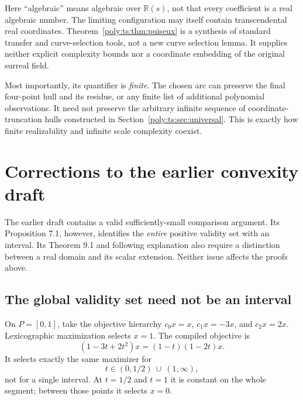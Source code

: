 \documentclass[11pt,a4paper]{article}
\numberwithin{equation}{section}
\theoremstyle{plain}
\newcommand{\R}{\mathbb R}
\begin{document}
Here ``algebraic'' means algebraic over $\R(s)$, not that every coefficient
is a real algebraic number. The limiting configuration may itself contain
transcendental real coordinates. Theorem~\ref{poly:ts:thm:puiseux} is a synthesis
of standard transfer and curve-selection tools, not a new curve selection
lemma. It supplies neither explicit complexity bounds nor a coordinate
embedding of the original surreal field.

Most importantly, its quantifier is \emph{finite}. The chosen arc can
preserve the final four-point hull and its residue, or any finite list of
additional polynomial observations. It need not preserve the arbitrary
infinite sequence of coordinate-truncation hulls constructed in
Section~\ref{poly:ts:sec:universal}. This is exactly how finite realizability and
infinite scale complexity coexist.

\section{Corrections to the earlier convexity draft}
\label{poly:sec:corrections}

The earlier draft \cite{fs:PriorDraft} contains a valid sufficiently-small
comparison argument. Its Proposition 7.1, however, identifies the
\emph{entire} positive validity set with an interval. Its Theorem 9.1 and
following explanation also require a distinction between a real domain
and its scalar extension. Neither issue affects the proofs above.

\subsection{The global validity set need not be an interval}

On $P=[0,1]$, take the objective hierarchy
$c_0x=x$, $c_1x=-3x$, and $c_2x=2x$. Lexicographic maximization selects
$x=1$. The compiled objective is
\[
 (1-3t+2t^2)x=(1-t)(1-2t)x.
\]
It selects exactly the same maximizer for
\begin{equation}\label{poly:eq:reentry}
 t\in(0,1/2)\ \cup\ (1,\infty),
\end{equation}
not for a single interval. At $t=1/2$ and $t=1$ it is constant on the
whole segment; between those points it selects $x=0$.
\end{document}
